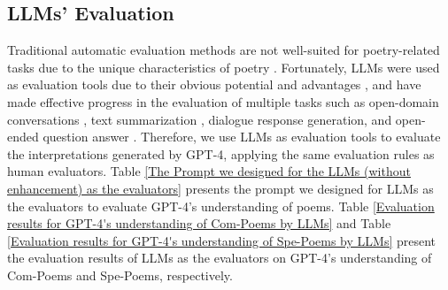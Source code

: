 \documentclass[11pt]{article}
\begin{document}


\subsection{LLMs’ Evaluation}




Traditional automatic evaluation methods are not well-suited for poetry-related tasks due to the unique characteristics of poetry \cite{novikova2017we, refaee2023okaz, wang-etal-2024-best}. Fortunately, LLMs were used as evaluation tools due to their obvious potential and advantages \cite{chiang2023can, wang2023chatgpt, liu2023g}, and have made effective progress in the evaluation of multiple tasks such as open-domain conversations \cite{lin2023llm}, text summarization \cite{chu2024pre}, dialogue response generation, and open-ended question answer \cite{chan2023chateval}. Therefore, we use LLMs as evaluation tools to evaluate the interpretations generated by GPT-4, applying the same evaluation rules as human evaluators. Table \ref{The Prompt we designed for the LLMs (without enhancement) as the evaluators} presents the prompt we designed for LLMs as the evaluators to evaluate GPT-4’s understanding of poems.
Table \ref{Evaluation results for GPT-4's understanding of Com-Poems by LLMs} and Table \ref{Evaluation results for GPT-4's understanding of Spe-Poems by LLMs} present the evaluation results of LLMs as the evaluators on GPT-4's understanding of Com-Poems and Spe-Poems, respectively.
\end{document}
